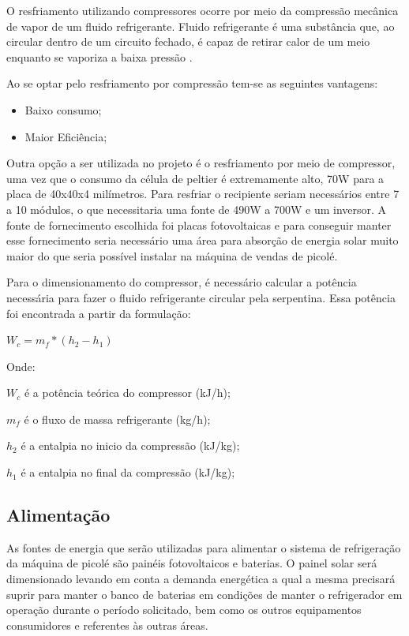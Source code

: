 O resfriamento utilizando compressores ocorre por meio da compressão mecânica de vapor de um fluido refrigerante. Fluido refrigerante é uma substância que, ao circular dentro de um circuito fechado, é capaz de retirar calor de um meio enquanto se vaporiza a baixa pressão \cite{teixeiraconcepccao}.

Ao se optar pelo resfriamento por compressão tem-se as seguintes vantagens:

\begin{itemize}
\item Baixo consumo;

\item Maior Eficiência;
\end{itemize}


Outra opção a ser utilizada no projeto é o resfriamento por meio de compressor, uma vez que o consumo da célula de peltier é extremamente alto, 70W para a placa de 40x40x4 milímetros. Para resfriar o recipiente seriam necessários entre 7 a 10 módulos, o que necessitaria uma fonte de 490W a 700W e um inversor. A fonte de fornecimento escolhida foi placas fotovoltaicas e para conseguir manter esse fornecimento seria necessário uma área para absorção de energia solar muito maior do que seria possível instalar na máquina de vendas de picolé. 


Para o dimensionamento do compressor, é necessário calcular a potência necessária para fazer o fluido refrigerante circular pela serpentina. Essa potência foi encontrada a
partir da formulação:

\begin{math} W_{c} = m_{f} * (h_{2} - h_{1})  \end{math}

Onde:

$W_{c}$ é a potência teórica do compressor (kJ/h);

$m_{f}$ é o fluxo de massa refrigerante (kg/h);

$h_{2}$ é a entalpia no inicio da compressão (kJ/kg);

$h_{1}$ é a entalpia no final da compressão (kJ/kg);


\subsection{Alimentação}
	As fontes de energia que serão utilizadas para alimentar o sistema de refrigeração da máquina de picolé são painéis fotovoltaicos e baterias. O painel solar será dimensionado levando em conta a demanda energética a qual a mesma precisará suprir para manter o banco de baterias em condições de manter o refrigerador em operação durante o período solicitado, bem como os outros equipamentos consumidores e referentes às outras áreas.
    
